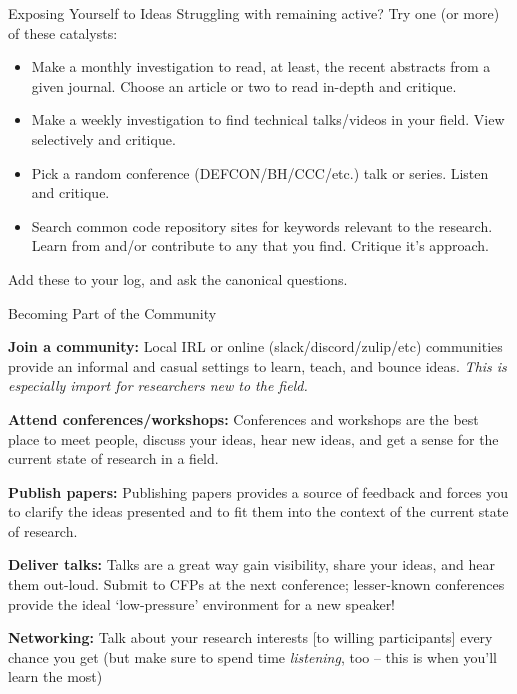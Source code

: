 \begin{frame}{Exposing Yourself to Ideas}
    Struggling with remaining active? Try one (or more) of these catalysts:
    \begin{itemize}
        \item{ Make a monthly investigation to read, at least, the recent abstracts from
            a given journal. Choose an article or two to read in-depth and critique.}
        \item{Make a weekly investigation to find technical talks/videos in your field. View selectively and critique.}
        \item{Pick a random conference (DEFCON/BH/CCC/etc.) talk or series. Listen and critique.}
        \item{Search common code repository sites for keywords relevant to the research. Learn from and/or contribute
            to any that you find. Critique it's approach.}
    \end{itemize}
    
    \begin{center}
    Add these to your log, and ask the canonical questions.
    \end{center}
\end{frame}


\begin{frame}{Becoming Part of the Community}
    \footnotesize{
        \textbf{Join a community:} Local IRL or online (slack/discord/zulip/etc) communities provide
        an informal and casual settings to learn, teach, and bounce ideas.
        \textit{This is especially import for researchers new to the field.}\vspace{1em}

        \textbf{Attend conferences/workshops:} Conferences and workshops are the best place to meet people,
        discuss your ideas, hear new ideas, and get a sense for the current state of research in a field.\vspace{1em}
        
        \textbf{Publish papers:} Publishing papers provides a source of feedback and forces
        you to clarify the ideas presented and to fit them into the context of the current state of research.\vspace{1em}

        \textbf{Deliver talks:} Talks are a great way gain visibility, share your ideas, and hear 
        them out-loud. Submit to CFPs at the next conference; lesser-known conferences
        provide the ideal `low-pressure' environment for a new speaker!\vspace{1em}

        \textbf{Networking:} Talk about your research interests [to willing participants] every chance you get (but make sure
        to spend time \textit{listening}, too -- this is when you'll learn the most)
    }
\end{frame}
